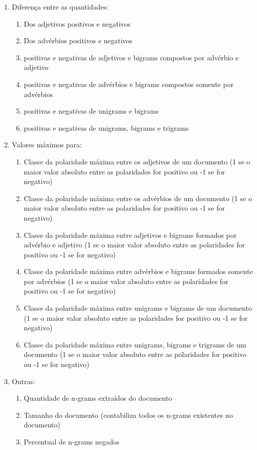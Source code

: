 \documentclass[template.tex]{subfiles}
\begin{document}
\begin{enumerate}
   \item Diferença entre as quantidades:
  \begin{enumerate}
     \item Dos adjetivos positivos e negativos
     \item Dos advérbios positivos e negativos
     \item positivas e negativas de adjetivos e bigrams compostos por advérbio e adjetivo
     \item positivas e negativas de advérbios e bigrams compostos somente por advérbios
     \item positivas e negativas de unigrams e bigrams
     \item positivas e negativas de unigrams, bigrams e trigrams
  \end{enumerate}
  
  \item Valores máximos para:
  \begin{enumerate}
	\item Classe da polaridade máxima entre os adjetivos de um documento (1 se o maior valor absoluto entre as polaridades for positivo ou -1 se for negativo)
	\item Classe da polaridade máxima entre os advérbios de um documento (1 se o maior valor absoluto entre as polaridades for positivo ou -1 se for negativo)
	\item Classe da polaridade máxima entre adjetivos e bigrams formados por advérbio e adjetivo (1 se o maior valor absoluto entre as polaridades for positivo ou -1 se for negativo)
	\item Classe da polaridade máxima entre advérbios e bigrams formados somente por advérbios (1 se o maior valor absoluto entre as polaridades for positivo ou -1 se for negativo)
	\item Classe da polaridade máxima entre unigrams e bigrams de um documento (1 se o maior valor absoluto entre as polaridades for positivo ou -1 se for negativo)
	\item Classe da polaridade máxima entre unigrams, bigrams e trigrams de um documento (1 se o maior valor absoluto entre as polaridades for positivo ou -1 se for negativo)
  \end{enumerate}
  \item Outras:
  \begin{enumerate}
  	\item Quantidade de n-grams extraídos do documento
	\item Tamanho do documento (contabiliza todos os n-grams existentes no documento)
	\item Percentual de n-grams negados
  \end{enumerate}
\end{enumerate}
\end{document}
